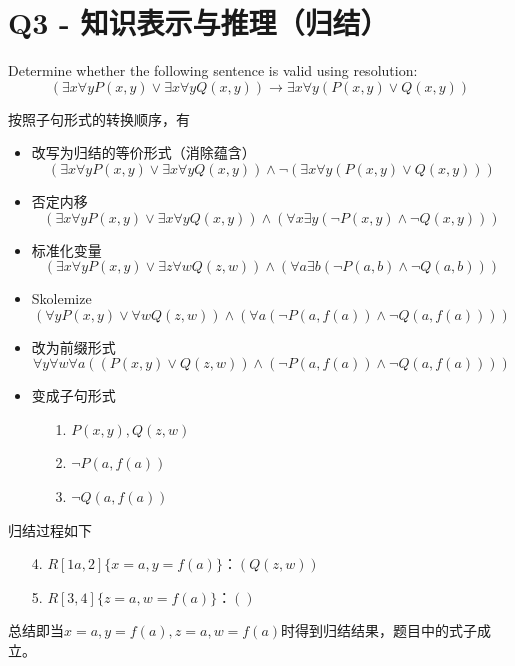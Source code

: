 \documentclass[a4paper, 11pt]{article}
\begin{document}
\begin{flushleft}
\end{flushleft}

\newpage
\section{Q3 - 知识表示与推理（归结）}
\begin{question}\normalfont
    Determine whether the following sentence is valid using resolution:
    \[(\exists x\forall y P(x,y)\lor\exists x\forall y Q(x,y))\to
    \exists x\forall y(P(x,y)\lor Q(x,y))\]
\end{question}
\begin{answer}
    按照子句形式的转换顺序，有
    \begin{itemize}
        \item 改写为归结的等价形式（消除蕴含）
        \[(\exists x\forall y P(x,y)\lor\exists x\forall y Q(x,y))\land\lnot
        (\exists x\forall y(P(x,y)\lor Q(x,y)))\]
        \item 否定内移
        \[(\exists x\forall y P(x,y)\lor\exists x\forall y Q(x,y))\land
        (\forall x\exists y (\lnot P(x,y)\land \lnot Q(x,y)))\]
        \item 标准化变量
        \[(\exists x\forall y P(x,y)\lor\exists z\forall w Q(z,w))\land
        (\forall a\exists b (\lnot P(a,b)\land \lnot Q(a,b)))\]
        \item Skolemize
        \[(\forall y P(x,y)\lor \forall w Q(z,w))\land
        (\forall a (\lnot P(a,f(a))\land \lnot Q(a,f(a))))\]
        \item 改为前缀形式
        \[\forall y\forall w\forall a ((P(x,y)\lor Q(z,w))\land
        (\lnot P(a,f(a))\land \lnot Q(a,f(a))))\]
        \item 变成子句形式
        \begin{itemize}
            \item [1.] $P(x,y),Q(z,w)$
            \item [2.] $\lnot P(a,f(a))$
            \item [3.] $\lnot Q(a,f(a))$
        \end{itemize}
    \end{itemize}
    归结过程如下
    \begin{enumerate}
        \item [4.] $R[1a,2]\{x=a,y=f(a)\}$：$(Q(z,w))$
        \item [5.] $R[3,4]\{z=a,w=f(a)\}$：$()$
    \end{enumerate}
    总结即当$x=a,y=f(a),z=a,w=f(a)$时得到归结结果，题目中的式子成立。
\end{answer}
\begin{flushleft}
\end{flushleft}
\end{document}
